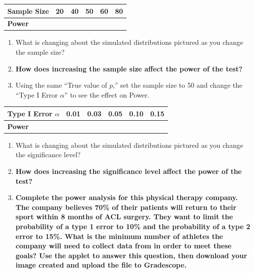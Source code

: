 \documentclass[
]{report}
\begin{document}
\setlength\tabcolsep{0.6cm}
\begin{longtable}{|l|c|c|c|c|c|}
\hline
\textbf{Sample Size}& 20 & 40 & 50 & 60 & 80 \\ \hline
\textbf{Power} & & & & &  \\ \hline
\end{longtable}

\begin{enumerate}
\def\labelenumi{\arabic{enumi}.}
\setcounter{enumi}{13}
\item
  What is changing about the simulated distributions pictured as you change the sample size?
  \vspace{0.5in}
\item
  \textbf{How does increasing the sample size affect the power of the test?}
  \vspace{0.5in}
\item
  Using the same ``True value of \(p\),'' set the sample size to 50 and change the ``Type I Error \(\alpha\)'' to see the effect on Power.
\end{enumerate}

\setlength\tabcolsep{0.5cm}
\begin{longtable}{|l|c|c|c|c|c|}
\hline
\textbf{Type I Error $\alpha$}& 0.01 & 0.03 & 0.05 & 0.10 & 0.15 \\ \hline
\textbf{Power} & & & & &  \\ \hline
\end{longtable}

\begin{enumerate}
\def\labelenumi{\arabic{enumi}.}
\setcounter{enumi}{16}
\item
  What is changing about the simulated distributions pictured as you change the significance level?
  \vspace{0.5in}
\item
  \textbf{How does increasing the significance level affect the power of the test?}
  \vspace{0.5in}
\item
  \textbf{Complete the power analysis for this physical therapy company. The company believes 70\% of their patients will return to their sport within 8 months of ACL surgery. They want to limit the probability of a type 1 error to 10\% and the probability of a type 2 error to 15\%. What is the minimum number of athletes the company will need to collect data from in order to meet these goals? Use the applet to answer this question, then download your image created and upload the file to Gradescope.}
  \vspace{0.25in}
\end{enumerate}
\end{document}
